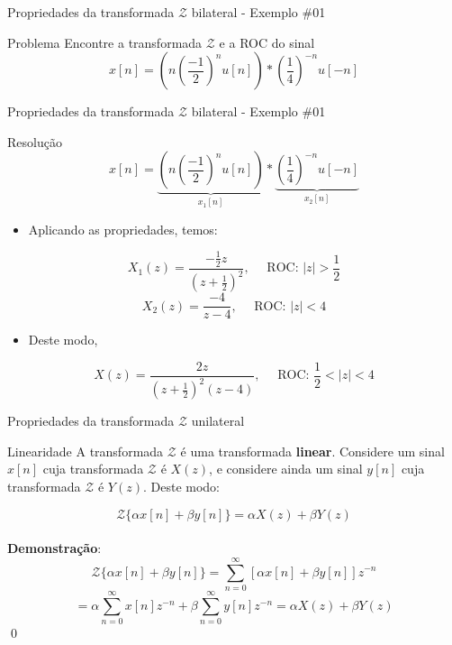 \begin{frame}{Propriedades da transformada $\mathcal{Z}$ bilateral - Exemplo \#01}
\begin{block}{Problema}
		Encontre a transformada $\mathcal{Z}$ e a ROC do sinal\\
		$$ x[n] = \left ( n\left ( \dfrac{-1}{2} \right )^n u[n]\right )\ast\left ( \dfrac{1}{4} \right )^{-n}u[-n] $$
\end{block}
\end{frame}

\begin{frame}{Propriedades da transformada $\mathcal{Z}$ bilateral - Exemplo \#01}
\begin{block}{Resolução}
	$$ x[n] = \underset{x_1[n]}{\underbrace{\left ( n\left ( \dfrac{-1}{2} \right )^n u[n]\right )}}\ast \underset{x_2[n]}{\underbrace{\left ( \dfrac{1}{4} \right )^{-n}u[-n]}} $$
	\begin{itemize}
	    \item Aplicando as propriedades, temos:
	\end{itemize}
	$$ X_1(z) = \dfrac{-\frac{1}{2}z}{\left ( z + \frac{1}{2} \right )^2}, \quad \text{ ROC: } \left | z \right |  > \frac{1}{2} $$
	$$ X_2(z) = \dfrac{-4}{z - 4}, \quad \text{ ROC: } \left | z \right |  < 4 $$
	\vspace{-0.2cm}
	\begin{itemize}
	    \item Deste modo,
	\end{itemize}
	$$ X(z) = \dfrac{2z}{\left ( z + \frac{1}{2} \right )^2 (z - 4)}, \quad \text{ ROC: } \frac{1}{2}< \left | z \right |  < 4 $$
\end{block}
\end{frame}

\begin{frame}{Propriedades da transformada $\mathcal{Z}$ unilateral}
\begin{block}{Linearidade}
A transformada $\mathcal{Z}$ é uma transformada \textbf{linear}. Considere um sinal $x[n]$ cuja transformada $\mathcal{Z}$ é $X(z)$, e considere ainda um sinal $y[n]$ cuja transformada $\mathcal{Z}$ é $Y(z)$. Deste modo:

$$\mathcal{Z}\{\alpha x[n] + \beta y[n]\} = \alpha X(z) + \beta Y(z)$$ \\
\vspace{0.2cm}
\textbf{Demonstração}: 
$$\mathcal{Z}\{\alpha x[n] + \beta y[n]\} = \sum_{n=0}^{\infty} \left[\alpha x[n] + \beta y[n]\right] z^{-n}$$
$$= \alpha \sum_{n=0}^{\infty} x[n] z^{-n} + \beta \sum_{n=0}^{\infty} y[n] z^{-n} = \alpha X(z) + \beta Y(z)$$ \qed
\end{block}
\end{frame}

